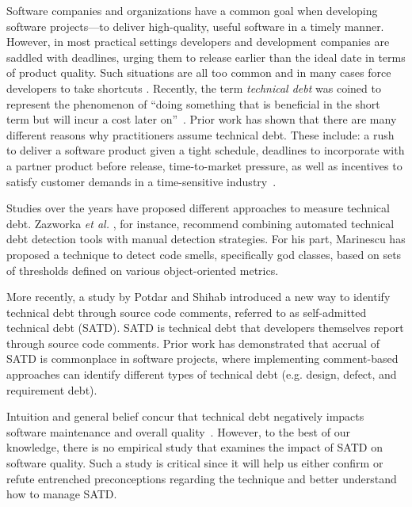 

Software companies and organizations have a common goal when developing software projects---to deliver high-quality, useful software in a timely manner. However, in most practical settings developers and development companies are saddled with deadlines, urging them to release earlier than the ideal date in terms of product quality. Such situations are all too common and in many cases force developers to take shortcuts \cite{kruchten2013technical} \cite{seaman2015technical}. Recently, the term \emph{technical debt} was coined to represent the phenomenon of ``doing something that is beneficial in the short term but will incur a cost later on''~\cite{cunningham1993wycash}. Prior work has shown that there are many different reasons why practitioners assume technical debt. These include: a rush to deliver a software product given a tight schedule, deadlines to incorporate with a partner product before release, time-to-market pressure, as well as incentives to satisfy customer demands in a time-sensitive industry~\cite{lim2012balancing}.

\revision Studies over the years have proposed different approaches to measure technical debt. Zazworka \textit{et al.} \cite{zazworka2011investigating}, for instance, recommend combining automated technical debt detection tools with manual detection strategies. For his part, Marinescu \cite{marinescu2004detection} has proposed a technique to detect code smells, specifically god classes, based on sets of thresholds defined on various object-oriented metrics.

More recently, a study by Potdar and Shihab \cite{ICSM_PotdarS14} introduced a new way to identify technical debt through source code comments, referred to as self-admitted technical debt (SATD). SATD is technical debt that developers themselves report through source code comments. Prior work \cite{MTD15p9} has demonstrated that accrual of SATD is commonplace in software projects, where implementing comment-based approaches can identify different types of technical debt (e.g. design, defect, and requirement debt).\par

Intuition and general belief concur that technical debt negatively impacts software maintenance and overall quality~\cite{zazworka2011investigating,spinola2013investigating,GuoSGCTSSS11,seaman2015technical,kruchten2013technical}. However, to the best of our knowledge, there is no empirical study that examines the impact of SATD on software quality. Such a study is critical since it will help us either confirm or refute entrenched preconceptions regarding the technique and better understand how to manage SATD.\par

